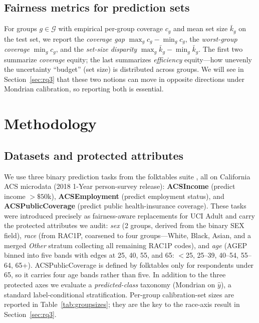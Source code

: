 \documentclass[review,12pt]{elsarticle}
\begin{document}
\subsection{Fairness metrics for prediction sets}
For groups $g \in \mathcal{G}$ with empirical per-group coverage $c_g$ and mean set size $\bar k_g$ on the test set, we report the \emph{coverage gap} $\max_g c_g - \min_g c_g$, the \emph{worst-group coverage} $\min_g c_g$, and the \emph{set-size disparity} $\max_g \bar k_g - \min_g \bar k_g$. The first two summarize \emph{coverage} equity; the last summarizes \emph{efficiency} equity---how unevenly the uncertainty ``budget'' (set size) is distributed across groups. We will see in Section~\ref{sec:rq3} that these two notions can move in opposite directions under Mondrian calibration, so reporting both is essential.

\section{Methodology}
\label{sec:method}

\subsection{Datasets and protected attributes}
We use three binary prediction tasks from the folktables suite \cite{ding2021}, all on California ACS microdata (2018 1-Year person-survey release): \textbf{ACSIncome} (predict income $>\$50$k), \textbf{ACSEmployment} (predict employment status), and \textbf{ACSPublicCoverage} (predict public health-insurance coverage). These tasks were introduced precisely as fairness-aware replacements for UCI Adult and carry the protected attributes we audit: \emph{sex} (2 groups, derived from the binary SEX field), \emph{race} (from RAC1P, coarsened to four groups---White, Black, Asian, and a merged \emph{Other} stratum collecting all remaining RAC1P codes), and \emph{age} (AGEP binned into five bands with edges at 25, 40, 55, and 65: $<$25, 25--39, 40--54, 55--64, 65+). ACSPublicCoverage is defined by folktables only for respondents under 65, so it carries four age bands rather than five. In addition to the three protected axes we evaluate a \emph{predicted-class} taxonomy (Mondrian on $\hat y$), a standard label-conditional stratification. Per-group calibration-set sizes are reported in Table~\ref{tab:groupsizes}; they are the key to the race-axis result in Section~\ref{sec:rq3}.
\end{document}
